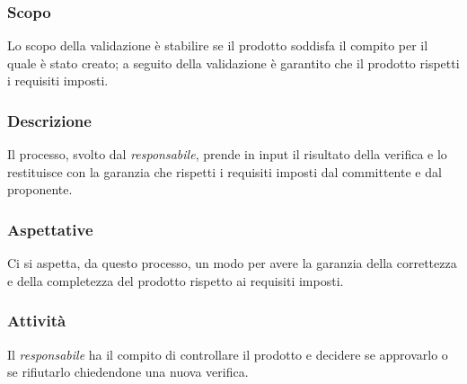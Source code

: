 \subsubsection{Scopo}

Lo scopo della validazione è stabilire se il prodotto soddisfa il compito per il quale è stato creato; a seguito della 
validazione è garantito che il prodotto rispetti i requisiti imposti.

\subsubsection{Descrizione}
\label{ssub:descrizione}

Il processo, svolto dal \emph{responsabile}, prende in input il risultato della verifica e lo restituisce con la 
garanzia che rispetti i requisiti imposti dal committente e dal proponente.

\subsubsection{Aspettative}
\label{ssub:aspettative}

Ci si aspetta, da questo processo, un modo per avere la garanzia della correttezza e della completezza del prodotto 
rispetto ai requisiti imposti.

\subsubsection{Attività}
\label{ssub:attivita}
Il \emph{responsabile} ha il compito di controllare il prodotto e decidere se approvarlo o se rifiutarlo chiedendone una 
nuova verifica.
